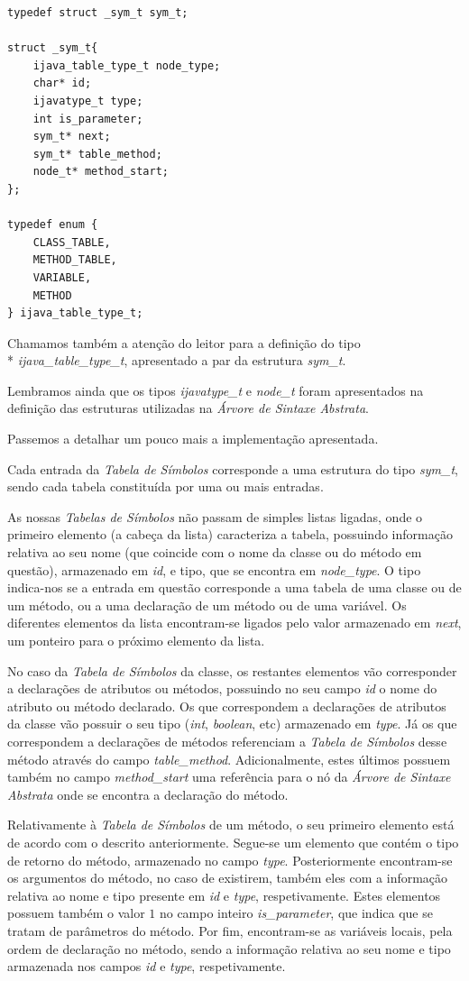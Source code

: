 \documentclass[11pt,a4paper]{article}
\begin{document}
	\begin{lstlisting}
typedef struct _sym_t sym_t;	

struct _sym_t{
	ijava_table_type_t node_type;
	char* id;
	ijavatype_t type;
	int is_parameter;
	sym_t* next;
	sym_t* table_method;
	node_t* method_start;
};

typedef enum {
	CLASS_TABLE,
	METHOD_TABLE,
	VARIABLE,
	METHOD
} ijava_table_type_t;
	\end{lstlisting}
	
	Chamamos também a atenção do leitor para a definição do tipo \\* \emph{ijava\_table\_type\_t}, apresentado a par da estrutura \emph{sym\_t}.
	
	Lembramos ainda que os tipos \emph{ijavatype\_t} e \emph{node\_t} foram apresentados na definição das estruturas utilizadas na \emph{Árvore de Sintaxe Abstrata}.
	
	Passemos a detalhar um pouco mais a implementação apresentada.
	
	Cada entrada da \emph{Tabela de Símbolos} corresponde a uma estrutura do tipo \emph{sym\_t}, sendo cada tabela constituída por uma ou mais entradas.
	
	As nossas \emph{Tabelas de Símbolos} não passam de simples listas ligadas, onde o primeiro elemento (a cabeça da lista) caracteriza a tabela, possuindo informação relativa ao seu nome (que coincide com o nome da classe ou do método em questão), armazenado em \emph{id}, e tipo, que se encontra em \emph{node\_type}. O tipo indica-nos se a entrada em questão corresponde a uma tabela de uma classe ou de um método, ou a uma declaração de um método ou de uma variável. Os diferentes elementos da lista encontram-se ligados pelo valor armazenado em \emph{next}, um ponteiro para o próximo elemento da lista.
	
	No caso da \emph{Tabela de Símbolos} da classe, os restantes elementos vão corresponder a declarações de atributos ou métodos, possuindo no seu campo \emph{id} o nome do atributo ou método declarado. Os que correspondem a declarações de atributos da classe vão possuir o seu tipo (\emph{int}, \emph{boolean}, etc) armazenado em \emph{type}. Já os que correspondem a declarações de métodos referenciam a \emph{Tabela de Símbolos} desse método através do campo  \emph{table\_method}. Adicionalmente, estes últimos possuem também no campo \emph{method\_start} uma referência para o nó da \emph{Árvore de Sintaxe Abstrata} onde se encontra a declaração do método.
	
	Relativamente à \emph{Tabela de Símbolos} de um método, o seu primeiro elemento está de acordo com o descrito anteriormente. Segue-se um elemento que contém o tipo de retorno do método, armazenado no campo \emph{type}. Posteriormente encontram-se os argumentos do método, no caso de existirem, também eles com a informação relativa ao nome e tipo presente em \emph{id} e \emph{type}, respetivamente. Estes elementos possuem também o valor $1$ no campo inteiro \emph{is\_parameter}, que indica que se tratam de parâmetros do método. Por fim, encontram-se as variáveis locais, pela ordem de declaração no método, sendo a informação relativa ao seu nome e tipo armazenada nos campos \emph{id} e \emph{type}, respetivamente.
	
\end{document}
